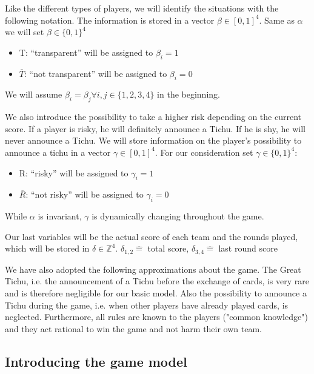 Like the different types of players, we will identify the situations with the following notation. The information is stored in a vector $\beta \in [0,1]^4$. Same as $\alpha$ we will set $\beta \in \{0,1\}^4$\\ 
\begin{itemize}
\item T: “transparent” will be assigned to $\beta_i = 1$
\item $\overline{T}$: “not transparent” will be assigned to $\beta_i = 0$ \\
\end{itemize}

We will assume  $\beta_i = \beta_j \forall i, j\in \{1,2,3,4\}$ in the beginning. 

We also introduce the possibility to take a higher risk depending on the current score. If a player is risky, he will definitely announce a Tichu. If he is shy, he will never announce a Tichu. We will store information on the player's possibility to announce a tichu in a vector $\gamma \in [0,1]^4$. For our consideration set  $\gamma \in \{0,1\}^4$: \\
\begin{itemize}
\item R: “risky” will be assigned to $\gamma_i = 1$
\item $\overline{R}$: “not risky” will be assigned to $\gamma_i = 0$ \\
\end{itemize}
While $\alpha$ is invariant, $\gamma$ is dynamically changing throughout the game. 

Our last variables will be the actual score of each team and the rounds played, which will be stored in $\delta \in \mathbb{Z}^4$. 
$\delta_{1,2} \widehat{=}$ total score, $\delta_{3,4} \widehat{=}$ last round score

We have also adopted the following approximations about the game.
The Great Tichu, i.e. the announcement of a Tichu before the exchange of cards, is very rare and is therefore negligible for our basic model.
Also the possibility to announce a Tichu during the game, i.e. when other players have already played cards, is neglected.
Furthermore, all rules are known to the players ("common knowledge") and they act rational to win the game and not harm their own team. 

\subsection{Introducing the game model}

